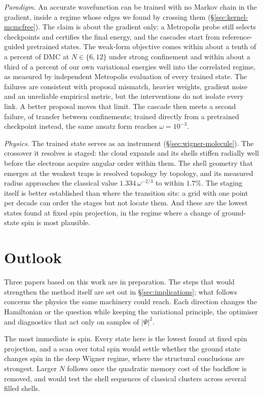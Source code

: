 \emph{Paradigm.} An accurate wavefunction can be trained with no Markov chain in the
gradient, inside a regime whose edges we found by crossing them
(\S\ref{sec:kernel-mcmcfree}). The claim is about the gradient only: a Metropolis probe still
selects checkpoints and certifies the final energy, and the cascades start from
reference-guided pretrained states. The weak-form objective comes within about a tenth of a
percent of DMC at $N\in\{6,12\}$ under strong confinement and within about a third of a
percent of our own variational energies well into the correlated regime, as measured by
independent Metropolis evaluation of every trained state. The failures are consistent with
proposal mismatch, heavier weights, gradient noise and an unreliable empirical metric, but
the interventions do not isolate every link. A better proposal moves that limit. The cascade then meets a second
failure, of transfer between confinements; trained directly from a pretrained checkpoint
instead, the same ansatz form reaches $\omega=10^{-3}$.

\emph{Physics.} The trained state serves as an instrument
(\S\ref{sec:wigner-molecule}). The crossover it resolves is staged: the cloud expands and its
shells stiffen radially well before the electrons acquire angular order within them. The
shell geometry that emerges at the weakest traps is resolved topology by topology, and its
measured radius approaches the classical value $1.334\,\omega^{-2/3}$ to within $1.7\%$. The
staging itself is better established than where the transition sits: a grid with one point
per decade can order the stages but not locate them. And these are the lowest states found
at fixed spin projection, in the regime where a change of ground-state spin is most
plausible.

\section{Outlook}
\label{sec:outlook}

Three papers based on this work are in preparation. The steps that would strengthen the
method itself are set out in \S\ref{sec:implications}; what follows concerns the physics the
same machinery could reach. Each direction changes the Hamiltonian or the question while
keeping the variational principle, the optimiser and diagnostics that act only on samples of
$|\Psi|^2$.

The most immediate is spin. Every state here is the lowest found at fixed spin projection,
and a scan over total spin would settle whether the ground state changes spin in the deep
Wigner regime, where the structural conclusions are strongest. Larger $N$ follows once the
quadratic memory cost of the backflow is removed, and would test the shell sequences of
classical clusters across several filled shells.

